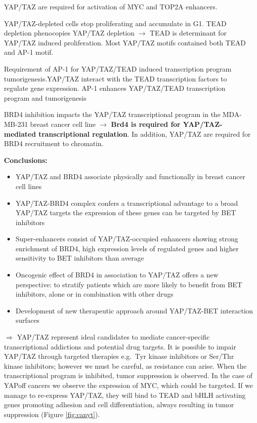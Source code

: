 YAP/TAZ are required for activation of MYC and TOP2A enhancers.

YAP/TAZ-depleted cells stop proliferating and accumulate in G1. TEAD depletion phenocopies YAP/TAZ depletion $\rightarrow$ TEAD is determinant for YAP/TAZ induced proliferation. Most YAP/TAZ motifs contained both TEAD and AP-1 motif.

Requirement of AP-1 for YAP/TAZ/TEAD induced transcription program tumorigenesis.YAP/TAZ interact with the TEAD transcription factors to regulate gene expression. AP-1 enhances YAP/TAZ/TEAD transcription program and tumorigenesis

BRD4 inhibition impacts the YAP/TAZ transcriptional program in the MDA-MB-231 breast cancer cell line $\rightarrow$ \textbf{Brd4 is required for YAP/TAZ-mediated transcriptional regulation}. In addition, YAP/TAZ are required for BRD4 recruitment to chromatin.

\textbf{Conclusions:}

\begin{itemize}
\tightlist
\item
  YAP/TAZ and BRD4 associate physically and functionally in breast cancer cell lines
\item
  YAP/TAZ-BRD4 complex confers a transcriptional advantage to a broad YAP/TAZ targets the expression of these genes can be targeted by BET inhibitors
\item
  Super-enhancers consist of YAP/TAZ-occupied enhancers showing strong enrichment of BRD4, high expression levels of regulated genes and higher sensitivity to BET inhibitors than average
\item
  Oncogenic effect of BRD4 in association to YAP/TAZ offers a new perspective:
  to stratify patients which are more likely to benefit from BET inhibitors, alone or in combination with other drugs
\item
  Development of new therapeutic approach around YAP/TAZ-BET interaction surfaces
\end{itemize}

$\Rightarrow$ YAP/TAZ represent ideal candidates to mediate cancer-specific transcriptional addictions
and potential drug targets.
It is possible to impair YAP/TAZ through targeted therapies e.g.~Tyr kinase inhibitors or Ser/Thr kinase inhibitors; however we must be careful, as resistance can arise. When the transcriptional program is inhibited, tumor suppression is observed. In the case of YAPoff cancers we observe the expression of MYC, which could be targeted. If we manage to re-express YAP/TAZ, they will bind to TEAD and bHLH activating genes promoting adhesion and cell differentiation, always resulting in tumor suppression (Figure \ref{fig:canyt}).

